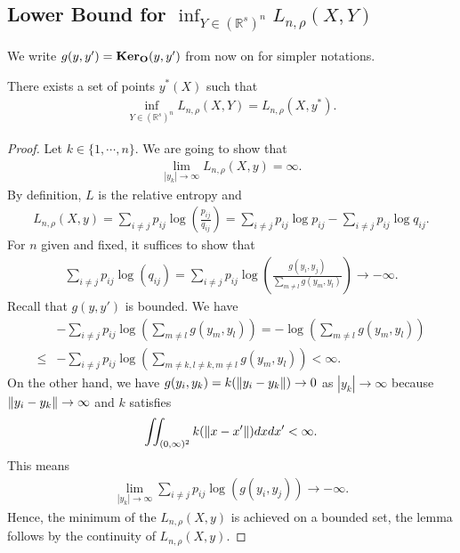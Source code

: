\subsection{Lower Bound for \texorpdfstring{$\inf_{Y \in (\mathbb{R}^s)^n}L_{n,\rho}(X,Y)$}{L(X,Y)}}
We write $g(y,y') = \mathbf{Ker}_{\mathbf{O}}(y,y')$ from now on for simpler notations.
\begin{lemma} \label{lower_bound_lemma_1}
    There exists a set of points $y^*(X)$ such that
    \begin{align}
        \inf_{Y \in (\mathbb{R}^s)^n}L_{n,\rho}(X,Y) = L_{n,\rho}(X,y^*).
    \end{align}
\end{lemma}
\begin{proof}
    Let $k \in \{1,\cdots, n\}$. We are going to show that
    \begin{align}
        \lim_{|y_k| \to \infty} L_{n,\rho}(X,y) = \infty.
    \end{align}
    By definition, $L$ is the relative entropy and
    \begin{align}
        L_{n,\rho}(X,y) = \sum_{i \neq j} p_{ij}\log \left(\frac{p_{ij}}{q_{ij}}\right) = \sum_{i \neq j} p_{ij}\log p_{ij} - \sum_{i \neq j} p_{ij}\log q_{ij}.
    \end{align}
    For $n$ given and fixed, it suffices to show that
    \begin{align}
        \sum_{i \neq j} p_{ij}\log (q_{ij}) = \sum_{i \neq j} p_{ij}\log \left(\frac{g(y_i,y_j)}{\sum_{m \neq l}g(y_m,y_l)}\right) \to -\infty.
    \end{align}
    Recall that $g(y,y')$ is bounded. We have
    \begin{align}
             & -\sum_{i \neq j} p_{ij} \log \left(\sum_{m \neq l}g(y_m,y_l) \right) = -\log \left(\sum_{m \neq l}g(y_m,y_l) \right) \nonumber \\
        \leq & -\sum_{i \neq j} p_{ij} \log \left(\sum_{m\neq k, l \neq k, m \neq l}g(y_m,y_l) \right) < \infty.
    \end{align}
    On the other hand, we have $g(y_i,y_k) = k (\left\lVert y_i-y_k\right\rVert) \to 0$ as $|y_k| \to \infty$ because $\left\lVert y_i-y_k\right\rVert \to \infty$ and $k$ satisfies
    \begin{align}
        \iint_{(0,\infty)^2} k(\left\lVert x-x'\right\rVert) dxdx' < \infty.
    \end{align}
    This means
    \begin{align}
        \lim_{|y_k| \to \infty}\sum_{i \neq j} p_{ij} \log (g(y_i,y_j)) \to -\infty.
    \end{align}
    Hence, the minimum of the $L_{n,\rho}(X,y)$ is achieved on a bounded set, the lemma follows by the continuity of $L_{n,\rho}(X,y)$.
\end{proof}

